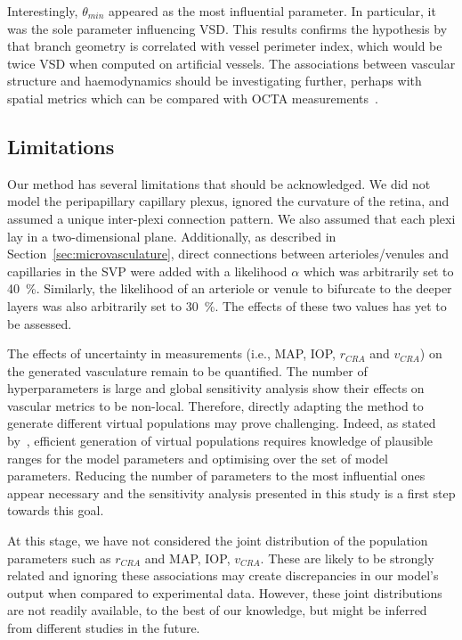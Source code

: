\documentclass[11pt,]{article}
\begin{document}
Interestingly, $\theta_{min}$ appeared as the most influential parameter.
In particular, it was the sole parameter influencing VSD.
This results confirms the hypothesis by \cite{Yao_2020} that branch geometry is correlated with vessel perimeter index, which would be twice VSD when computed on artificial vessels.
The associations between vascular structure and haemodynamics should be investigating further, perhaps with spatial metrics which can be compared with OCTA measurements~\cite{Yao_2020}.

\subsection{Limitations}\label{sec:disc-limitations}

Our method has several limitations that should be acknowledged.
We did not model the peripapillary capillary plexus, ignored the curvature of the retina, and assumed a unique inter-plexi connection pattern.
We also assumed that each plexi lay in a two-dimensional plane.
Additionally, as described in Section~\ref{sec:microvasculature}, direct connections between arterioles/venules and capillaries in the SVP were added with a likelihood $\alpha$ which was arbitrarily set to \SI{40}{\percent}.
Similarly, the likelihood of an arteriole or venule to bifurcate to the deeper layers was also arbitrarily set to \SI{30}{\percent}.
The effects of these two values has yet to be assessed.

The effects of uncertainty in measurements (i.e., MAP, IOP, $r_{CRA}$ and $v_{CRA}$) on the generated vasculature remain to be quantified.
The number of hyperparameters is large and global sensitivity analysis show their effects on vascular metrics to be non-local.
Therefore, directly adapting the method to generate different virtual populations may prove challenging.
Indeed, as stated by~\cite{Allen_2016}, efficient generation of virtual populations requires knowledge of plausible ranges for the model parameters and optimising over the set of model parameters.
Reducing the number of parameters to the most influential ones appear necessary and the sensitivity analysis presented in this study is a first step towards this goal.

At this stage, we have not considered the joint distribution of the population parameters such as $r_{CRA}$ and MAP, IOP, $v_{CRA}$.
These are likely to be strongly related and ignoring these associations may create discrepancies in our model's output when compared to experimental data.
However, these joint distributions are not readily available, to the best of our knowledge, but might be inferred from different studies in the future.
\end{document}
